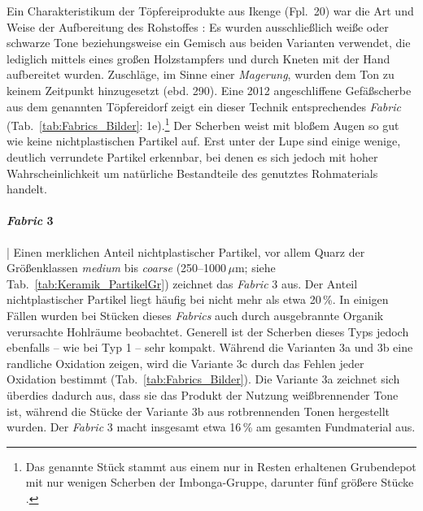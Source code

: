 \begin{multicols}{2}
Ein Charakteristikum der Töpfereiprodukte aus Ikenge (Fpl.~20) war die Art und Weise der Aufbereitung des Rohstoffes \parencites{Eggert.1980c}{Wotzka.1991}: Es wurden ausschließlich weiße oder schwarze Tone beziehungsweise ein Gemisch aus beiden Varianten verwendet, die lediglich mittels eines großen Holzstampfers und durch Kneten mit der Hand aufbereitet wurden. Zuschläge, im Sinne einer \textit{Magerung}, wurden dem Ton zu keinem Zeitpunkt hinzugesetzt (ebd. 290). Eine 2012 angeschliffene Gefäßscherbe aus dem genannten Töpfereidorf zeigt ein dieser Technik entsprechendes \textit{Fabric} (Tab.~\ref{tab:Fabrics_Bilder}: 1e).\footnote{Das genannte Stück stammt aus einem nur in Resten erhaltenen Grubendepot mit nur wenigen Scherben der Imbonga-Gruppe, darunter fünf größere Stücke \parencite[332 Kat.-Nr.~22]{Wotzka.1995}.} Der Scherben weist mit bloßem Augen so gut wie keine nichtplastischen Partikel auf. Erst unter der Lupe sind einige wenige, deutlich verrundete Partikel erkennbar, bei denen es sich jedoch mit hoher Wahrscheinlichkeit um natürliche Bestandteile des genutztes Rohmaterials handelt. 
	
\paragraph{\textit{Fabric} 3}\hspace{-.5em}|\hspace{.5em}%
Einen merklichen Anteil nichtplastischer Partikel, vor allem Quarz der Größenklassen \textit{medium} bis \textit{coarse} (250--1000\,$\mu$m; siehe Tab.~\ref{tab:Keramik_PartikelGr}) zeichnet das \textit{Fabric} 3 aus. Der Anteil nichtplastischer Partikel liegt häufig bei nicht mehr als etwa 20\,\%. In einigen Fällen wurden bei Stücken dieses \textit{Fabrics} auch durch ausgebrannte Organik verursachte Hohlräume beobachtet. Generell ist der Scherben dieses Typs jedoch ebenfalls -- wie bei Typ 1 -- sehr kompakt. Während die Varianten 3a und 3b eine randliche Oxidation zeigen, wird die Variante 3c durch das Fehlen jeder Oxidation bestimmt (Tab.~\ref{tab:Fabrics_Bilder}). Die Variante 3a zeichnet sich überdies dadurch aus, dass sie das Produkt der Nutzung weißbrennender Tone ist, während die Stücke der Variante 3b aus rotbrennenden Tonen hergestellt wurden. Der \textit{Fabric} 3 macht insgesamt etwa 16\,\% am gesamten Fundmaterial aus.


\end{multicols}
